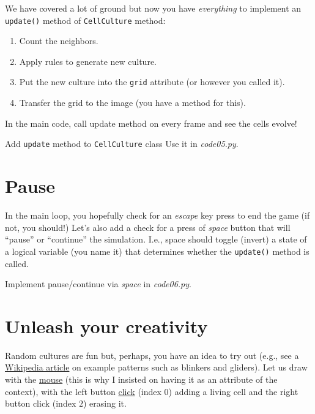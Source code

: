 \documentclass[
]{book}
\providecommand{\tightlist}{%
  \setlength{\itemsep}{0pt}\setlength{\parskip}{0pt}}
\begin{document}
We have covered a lot of ground but now you have \emph{everything} to implement an \texttt{update()} method of \texttt{CellCulture} method:

\begin{enumerate}
\def\labelenumi{\arabic{enumi}.}
\tightlist
\item
  Count the neighbors.
\item
  Apply rules to generate new culture.
\item
  Put the new culture into the \texttt{grid} attribute (or however you called it).
\item
  Transfer the grid to the image (you have a method for this).
\end{enumerate}

In the main code, call update method on every frame and see the cells evolve!

Add \texttt{update} method to \texttt{CellCulture} class
Use it in \emph{code05.py}.

\hypertarget{pause}{%
\section{Pause}\label{pause}}

In the main loop, you hopefully check for an \emph{escape} key press to end the game (if not, you should!) Let's also add a check for a press of \emph{space} button that will ``pause'' or ``continue'' the simulation. I.e., space should toggle (invert) a state of a logical variable (you name it) that determines whether the \texttt{update()} method is called.

Implement pause/continue via \emph{space} in \emph{code06.py}.

\hypertarget{unleash-your-creativity}{%
\section{Unleash your creativity}\label{unleash-your-creativity}}

Random cultures are fun but, perhaps, you have an idea to try out (e.g., see a \href{https://en.wikipedia.org/wiki/Conway\%27s_Game_of_Life}{Wikipedia article} on example patterns such as blinkers and gliders). Let us draw with the \href{https://psychopy.org/api/event.html\#psychopy.event.Mouse}{mouse} (this is why I insisted on having it as an attribute of the context), with the left button \href{https://psychopy.org/api/event.html\#psychopy.event.Mouse}{click} (index \(0\)) adding a living cell and the right button click (index \(2\)) erasing it.
\end{document}
